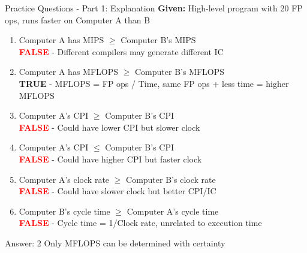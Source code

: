 \documentclass[aspectratio=169,12pt]{beamer}
\begin{document}
\begin{frame}{Practice Questions - Part 1: Explanation}
\scriptsize
\textbf{Given:} High-level program with 20 FP ops, runs faster on Computer A than B

\begin{enumerate}
    \item Computer A has MIPS $\geq$ Computer B's MIPS\\
    \pause
    \hspace{1em}\colorbox{red!20}{\textcolor{red}{\textbf{FALSE}}} - Different compilers may generate different IC
    \pause
    
    \item Computer A has MFLOPS $\geq$ Computer B's MFLOPS\\
    \pause
    \hspace{1em}\colorbox{green!20}{\textcolor{green!50!black}{\textbf{TRUE}}} - MFLOPS = FP ops / Time, same FP ops + less time = higher MFLOPS
    \pause
    
    \item Computer A's CPI $\geq$ Computer B's CPI\\
    \pause
    \hspace{1em}\colorbox{red!20}{\textcolor{red}{\textbf{FALSE}}} - Could have lower CPI but slower clock
    \pause
    
    \item Computer A's CPI $\leq$ Computer B's CPI\\
    \pause
    \hspace{1em}\colorbox{red!20}{\textcolor{red}{\textbf{FALSE}}} - Could have higher CPI but faster clock
    \pause
    
    \item Computer A's clock rate $\geq$ Computer B's clock rate\\
    \pause
    \hspace{1em}\colorbox{red!20}{\textcolor{red}{\textbf{FALSE}}} - Could have slower clock but better CPI/IC
    \pause
    
    \item Computer B's cycle time $\geq$ Computer A's cycle time\\
    \pause
    \hspace{1em}\colorbox{red!20}{\textcolor{red}{\textbf{FALSE}}} - Cycle time = 1/Clock rate, unrelated to execution time
\end{enumerate}

\pause
\begin{alertblock}{Answer: 2}
Only MFLOPS can be determined with certainty
\end{alertblock}
\end{frame}
\end{document}
